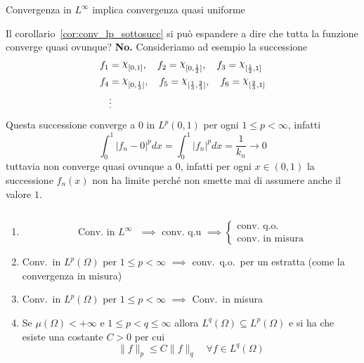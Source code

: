 \begin{remark}
    Convergenza in \(L^{\infty}\) implica convergenza quasi uniforme
\end{remark}

Il corollario~\ref{cor:conv_lp_sottosucc} si può espandere a dire che tutta la funzione converge quasi
ovunque? \textbf{No.} Consideriamo ad esempio la successione
\begin{align*}
    f_{1} &= \rchi_{[0, 1]}, \quad f_{2} = \rchi_{[0, \frac{1}{2}]}, \quad f_{3} =
    \rchi_{[\frac{1}{2}, 1]} \\
    f_{4} &= \rchi_{[0, \frac{1}{3}]}, \quad f_{5} = \rchi_{[\frac{1}{3},
    \frac{2}{3}]}, \quad f_{6} = \rchi_{[\frac{2}{3}, 1]} \\ 
          &\vdots
\end{align*}
Questa successione converge a \(0\) in \(L^{p}(0,1)\) per ogni \(1 \le p <
\infty\), infatti 
\[
    \int_{0}^{1} |f_{n} - 0|^{p} dx = \int_{0}^{1} |f_{n}|^{p} dx = \frac{1}{k_n}
    \to 0
\]
tuttavia non converge quasi ovunque a \(0\), infatti per ogni \(x \in (0, 1)\)
la successione \(f_{n}{(x)}\) non ha limite perché non smette mai di assumere
anche il valore \(1\).
\begin{proposition}[Convergenze] \( \) 
\begin{enumerate}[label = \arabic*.]
    \item \[
        \text{ Conv.~in \(L^{\infty}\)  } \implies \text{ conv.~q.u } \implies
        \begin{cases}
            \text{conv.~q.o.} \\
            \text{conv.~in misura}
        \end{cases}
    \]
    \item Conv.~in \(L^{p}{(\Omega)}\) per \(1 \le p< \infty\) \(\implies \)
        conv.~q.o.~per un estratta (come la convergenza in misura)
    \item Conv.~in \(L^{p}{(\Omega)}\) per \(1 \le p < \infty\) \(\implies\)
        Conv.~in misura
    \item Se \(\mu{(\Omega)} < +\infty\) e \(1 \le p < q \le \infty\) allora
        \(L^{q}{(\Omega)} \subseteq L^{p}{(\Omega)}\) e si ha che esiste una
        costante \(C > 0\) per cui
        \[
            \|f\|_p \le C \|f\|_q \quad \forall f \in L^{q}{(\Omega)}
        \]
\end{enumerate}
\end{proposition}
